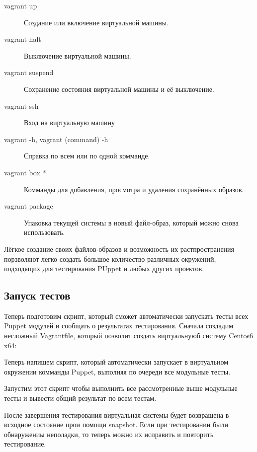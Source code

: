\begin{description}
\item[vagrant up] Создание или включение виртуальной машины.
\item[vagrant halt] Выключение виртуальной машины.
\item[vagrant suspend] Сохранение состояния виртуальной машины и её выключение.
\item[vagrant ssh] Вход на виртуальную машину
\item[vagrant -h, vagrant (command) -h] Справка по всем или по одной комманде.
\item[vagrant box *] Комманды для добавления, просмотра и удаления сохранённых образов.
\item[vagrant package] Упаковка текущей системы в новый файл-образ, который можно снова использовать.
\end{description}

Лёгкое создание своих файлов-образов и возможность их растпространения порзволяют легко создать большое количество различных окружений, подходящих для тестирования PUppet и любых других проектов.

\subsection{Запуск тестов}

Теперь подготовим скрипт, который сможет автоматически запускать тесты всех Puppet модулей и сообщать о результатах тестирования. Сначала создадим несложный Vagrantfile, который позволит создать виртуальнуюб систему Centos6 x64:


Теперь напишем скрипт, который автоматически запускает в виртуальном окружении комманды Puppet, выполняя по очереди все модульные тесты.



Запустим этот скрипт чтобы выполнить все рассмотренные выше модульные тесты и вывести общий результат по всем тестам.


После завершения тестирования виртуальная системы будет возвращена в исходное состояние прои помощи snapshot. Если при тестировании были обнаружениы неполадки, то теперь можно их исправить и повторить тестирование.
